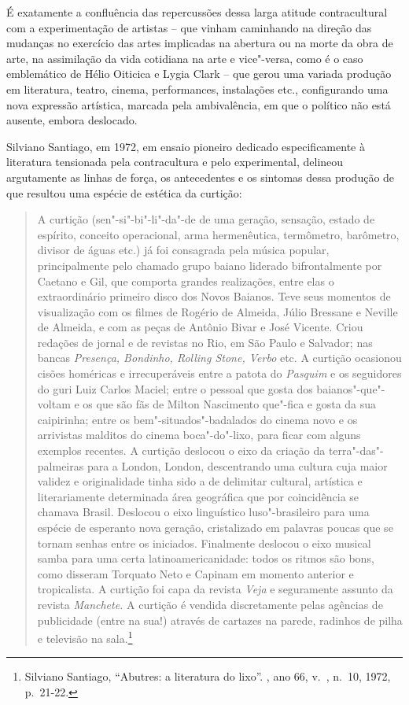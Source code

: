 É exatamente a confluência das repercussões dessa larga atitude
contracultural com a experimentação de artistas -- que vinham caminhando
na direção das mudanças no exercício das artes implicadas na abertura ou
na morte da obra de arte, na assimilação da vida cotidiana na arte e
vice"-versa, como é o caso emblemático de Hélio Oiticica e Lygia Clark --
que gerou uma variada produção em literatura, teatro, cinema,
performances, instalações etc., configurando uma nova expressão
artística, marcada pela ambivalência, em que o político não está
ausente, embora deslocado.

\asterisc

Silviano Santiago, em 1972, em ensaio pioneiro dedicado especificamente
à literatura tensionada pela contracultura e pelo experimental, delineou
argutamente as linhas de força, os antecedentes e os sintomas dessa
produção de que resultou uma espécie de estética da curtição:

\begin{quote}
A curtição (sen"-si"-bi"-li"-da"-de de uma geração, sensação, estado de
espírito, conceito operacional, arma hermenêutica, termômetro,
barômetro, divisor de águas etc.) já foi consagrada pela música popular,
principalmente pelo chamado grupo baiano liderado bifrontalmente por
Caetano e Gil, que comporta grandes realizações, entre elas o
extraordinário primeiro disco dos Novos Baianos. Teve seus momentos de
visualização com os filmes de Rogério de Almeida, Júlio Bressane e
Neville de Almeida, e com as peças de Antônio Bivar e José Vicente.
Criou redações de jornal e de revistas no Rio, em São Paulo e Salvador;
nas bancas \emph{Presença, Bondinho, Rolling Stone, Verbo} etc. A
curtição ocasionou cisões homéricas e irrecuperáveis entre a patota do
\emph{Pasquim} e os seguidores do guri Luiz Carlos Maciel; entre o
pessoal que gosta dos baianos"-que"-voltam e os que são fãs de Milton
Nascimento que"-fica e gosta da sua caipirinha; entre os
bem"-situados"-badalados do cinema novo e os arrivistas malditos do cinema
boca"-do"-lixo, para ficar com alguns exemplos recentes. A curtição
deslocou o eixo da criação da terra"-das"-palmeiras para a London, London,
descentrando uma cultura cuja maior validez e originalidade tinha sido a
de delimitar cultural, artística e literariamente determinada área
geográfica que por coincidência se chamava Brasil. Deslocou o eixo
linguístico luso"-brasileiro para uma espécie de esperanto nova geração,
cristalizado em palavras poucas que se tornam senhas entre os iniciados.
Finalmente deslocou o eixo musical samba para uma certa
latinoamericanidade: todos os ritmos são bons, como disseram Torquato
Neto e Capinam em momento anterior e tropicalista. A curtição foi capa
da revista \emph{Veja} e seguramente assunto da revista \emph{Manchete.} A
curtição é vendida discretamente pelas agências de publicidade (entre na
sua!) através de cartazes na parede, radinhos de pilha e televisão na
sala.\footnote{Silviano Santiago, ``Abutres: a literatura do lixo''.
  {}, ano 66, v.~, n.~10, 1972, p.~21-22.}
\end{quote}

